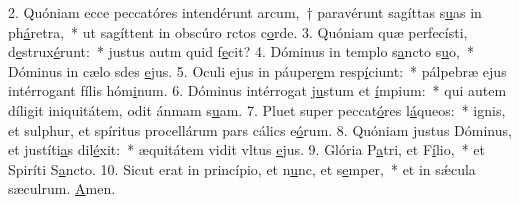 2. Quóniam ecce peccatóres intendérunt arcum,~† paravérunt sagíttas s\uline{u}as in ph\uline{á}retra,~* ut sagíttent in obscúro rctos c\uline{o}rde.
3. Quóniam quæ perfecísti, d\uline{e}strux\uline{é}runt:~* justus autm quid f\uline{e}cit?
4. Dóminus in templo s\uline{a}ncto s\uline{u}o,~* Dóminus in cælo sdes \uline{e}jus.
5. Oculi ejus in páuper\uline{e}m resp\uline{í}ciunt:~* pálpebræ ejus intérrogant fílis hóm\uline{i}num.
6. Dóminus intérrogat j\uline{u}stum et \uline{í}mpium:~* qui autem díligit iniquitátem, odit ánmam s\uline{u}am.
7. Pluet super peccat\uline{ó}res l\uline{á}queos:~* ignis, et sulphur, et spíritus procellárum pars cálics e\uline{ó}rum.
8. Quóniam justus Dóminus, et justíti\uline{a}s dil\uline{é}xit:~* æquitátem vidit vltus \uline{e}jus.
9. Glória P\uline{a}tri, et F\uline{í}lio,~* et Spiríti S\uline{a}ncto.
10. Sicut erat in princípio, et n\uline{u}nc, et s\uline{e}mper,~* et in sǽcula sæculrum. \uline{A}men.
